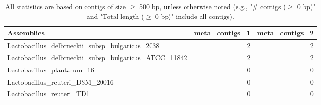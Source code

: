 \documentclass[12pt,a4paper]{article}
\begin{document}
\begin{table}[ht]
\begin{center}
\caption{All statistics are based on contigs of size $\geq$ 500 bp, unless otherwise noted (e.g., "\# contigs ($\geq$ 0 bp)" and "Total length ($\geq$ 0 bp)" include all contigs).}
\begin{tabular}{|l*{2}{|r}|}
\hline
Assemblies & meta\_contigs\_1 & meta\_contigs\_2 \\ \hline
Lactobacillus\_delbrueckii\_subsp\_bulgaricus\_2038 & 2 & 2 \\ \hline
Lactobacillus\_delbrueckii\_subsp\_bulgaricus\_ATCC\_11842 & 2 & 2 \\ \hline
Lactobacillus\_plantarum\_16 & 0 & 0 \\ \hline
Lactobacillus\_reuteri\_DSM\_20016 & 0 & 0 \\ \hline
Lactobacillus\_reuteri\_TD1 & 0 & 0 \\ \hline
\end{tabular}
\end{center}
\end{table}
\end{document}
